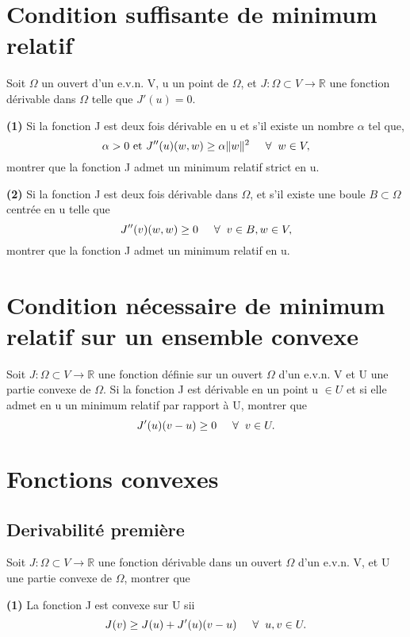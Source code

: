 \documentclass[11pt, a4paper]{article}
\newcommand{\mq}{montrer que }
\begin{document}
\medskip
\section{Condition suffisante de minimum relatif}
%
Soit $\Omega$ un ouvert d'un e.v.n. V, u un point de $\Omega$, et $J:\Omega \subset V \rightarrow \mathbb{R}$ une fonction dérivable dans $\Omega$ telle que $J'(u)=0$. 

\textbf{(1)} Si la fonction J est deux fois dérivable en u et s'il existe un nombre $\alpha$ tel que, $$ \alpha > 0 \text{ et } J''(u)(w,w)\geq \alpha\Vert w \Vert^{2} \hspace{5mm} \forall \hspace{2mm} w\in V,$$ \mq la fonction J admet un minimum relatif strict en u.

\textbf{(2)} Si la fonction J est deux fois dérivable dans $\Omega$, et s'il existe une boule $B \subset \Omega$ centrée en u telle que $$ J''(v)(w,w) \geq 0 \hspace{5mm} \forall \hspace{2mm} v\in B, \vspace{2mm} w\in V,$$ \mq la fonction J admet un minimum relatif en u.

\medskip
\section{Condition nécessaire de minimum relatif sur un ensemble convexe}
%
Soit $J:\Omega \subset V \rightarrow \mathbb{R}$ une fonction définie sur un ouvert $\Omega$ d'un e.v.n. V et U une partie convexe de $\Omega$. Si la fonction J est dérivable en un point u $\in U$ et si elle admet en u un minimum relatif par rapport à U, \mq $$ J'(u)(v-u)\geq 0 \hspace{5mm} \forall \hspace{2mm} v\in U.$$ 

\medskip
\section{Fonctions convexes}
\subsection{Derivabilité première}

Soit $J:\Omega \subset V \rightarrow \mathbb{R}$ une fonction dérivable dans un ouvert $\Omega$ d'un e.v.n. V, et U une partie convexe de $\Omega$, \mq

\textbf{(1)} La fonction J est convexe sur U sii $$ J(v) \geq J(u) + J'(u)(v-u) \hspace{5mm} \forall \hspace{2mm} u,v \in U.$$
\end{document}
